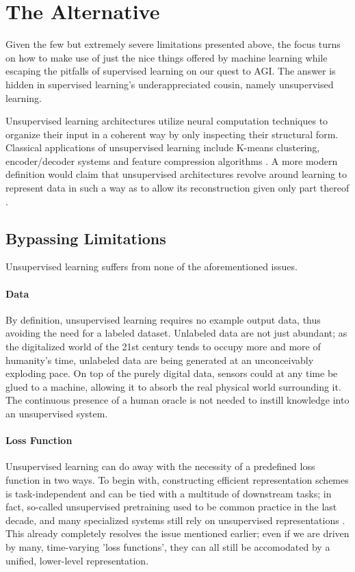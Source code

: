 \documentclass[]{article}
\begin{document}
\section{The Alternative}
Given the few but extremely severe limitations presented above, the focus turns on how to make use of just the nice things offered by machine learning while escaping the pitfalls of supervised learning on our quest to AGI. The answer is hidden in supervised learning's underappreciated cousin, namely unsupervised learning.

Unsupervised learning architectures utilize neural computation techniques to organize their input in a coherent way by only inspecting their structural form. Classical applications of unsupervised learning include K-means clustering, encoder/decoder systems and feature compression algorithms \cite{Ghahramani2004}. A more modern definition would claim that unsupervised architectures revolve around learning to represent data in such a way as to allow its reconstruction given only part thereof \cite{lecun2016}.

\subsection{Bypassing Limitations}
Unsupervised learning suffers from none of the aforementioned issues. 

\paragraph{Data}
By definition, unsupervised learning requires no example output data, thus avoiding the need for a labeled dataset. Unlabeled data are not just abundant; as the digitalized world of the 21st century tends to occupy more and more of humanity's time, unlabeled data are being generated at an unconceivably exploding pace. On top of the purely digital data, sensors could at any time be glued to a machine, allowing it to absorb the real physical world surrounding it. The continuous presence of a human oracle is not needed to instill knowledge into an unsupervised system.

\paragraph{Loss Function}
Unsupervised learning can do away with the necessity of a predefined loss function in two ways. To begin with, constructing efficient representation schemes is task-independent and can be tied with a multitude of downstream tasks; in fact, so-called unsupervised pretraining used to be common practice in the last decade, and many specialized systems still rely on unsupervised representations \cite{DBLP:journals/jmlr/ErhanBCMVB10}. This already completely resolves the issue mentioned earlier; even if we are driven by many, time-varying 'loss functions', they can all still be accomodated by a unified, lower-level representation.
\end{document}
